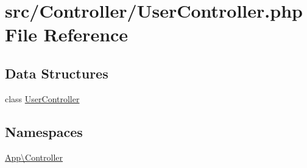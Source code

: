 \hypertarget{_user_controller_8php}{}\section{src/\+Controller/\+User\+Controller.php File Reference}
\label{_user_controller_8php}
\subsection*{Data Structures}
\begin{DoxyCompactItemize}
\item 
class \mbox{\hyperlink{class_app_1_1_controller_1_1_user_controller}{User\+Controller}}
\end{DoxyCompactItemize}
\subsection*{Namespaces}
\begin{DoxyCompactItemize}
\item 
 \mbox{\hyperlink{namespace_app_1_1_controller}{App\textbackslash{}\+Controller}}
\end{DoxyCompactItemize}
